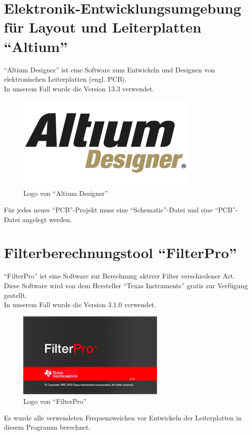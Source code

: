 \section{Elektronik-Entwicklungsumgebung für Layout und Leiterplatten \enquote{Altium}} \label{sec:6.1}
\enquote{Altium Designer} ist eine Software zum Entwickeln und Designen von elektronischen Leiterplatten (engl. PCB).\\
In unserem Fall wurde die Version 13.3 verwendet. 
\begin{figure} [H]
	\centering
	\includegraphics[width=0.8\textwidth]{img/Grundlagen/Altium/ad_logo.png}
	\caption[Logo von \enquote{Altium Designer}]{Logo von \enquote{Altium Designer}\footnotemark}
	\label{fig:6.1.1}
\end{figure}
Für jedes neues \enquote{PCB}-Projekt muss eine \enquote{Schematic}-Datei und eine \enquote{PCB}-Datei angelegt werden.

\newpage
\section{Filterberechnungstool \enquote{FilterPro}}\label{sec:6.2}
\enquote{FilterPro} ist eine Software zur Berechnung aktiver Filter verschiedener Art.
Diese Software wird von dem Hersteller \enquote{Texas Instruments} gratis zur Verfügung gestellt.\\
In unserem Fall wurde die Version 3.1.0 verwendet. 
\begin{figure} [H]
	\centering
	\includegraphics[width=0.65\textwidth]{img/VerwendeteTools/FilterPro.jpg}
	\caption[Logo von \enquote{FilterPro}]{Logo von \enquote{FilterPro}}
	\label{fig:6.2.1}
\end{figure}
Es wurde alle verwendeten Frequenzweichen vor Entwickeln der Leiterplatten in diesem Programm berechnet.
